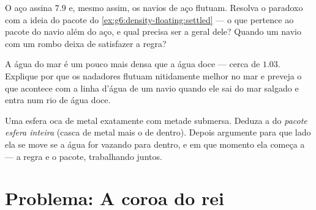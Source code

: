 \begin{exercise}[$\star\star$]\label{exo:g6:density-floating:10}
O aço assina $7.9$ e, mesmo assim, os navios de aço flutuam. Resolva
o paradoxo com a ideia do pacote do
\cref{ex:g6:density-floating:settled} --- o que pertence ao pacote
do navio além do aço, e qual precisa ser a  geral dele?
Quando um navio com um rombo deixa de satisfazer a regra?
\end{exercise}

\begin{exercise}[$\star\star$]\label{exo:g6:density-floating:11}
A água do mar é um pouco mais densa que a água doce --- cerca de
$1.03$. Explique por que os nadadores flutuam nitidamente melhor no
mar e preveja o que acontece com a linha d'água de um navio quando
ele sai do mar salgado e entra num rio de água doce.
\end{exercise}

\begin{exercise}[$\star\star\star$]\label{exo:g6:density-floating:12}
Uma esfera oca de metal  exatamente com metade submersa.
Deduza a  do \emph{pacote esfera inteira} (casca de metal
mais o  de dentro). Depois argumente para que lado ela se move se a
água for vazando para dentro, e em que momento ela começa a 
--- a regra e o pacote, trabalhando juntos.
\end{exercise}

\section{Problema: A coroa do rei}

